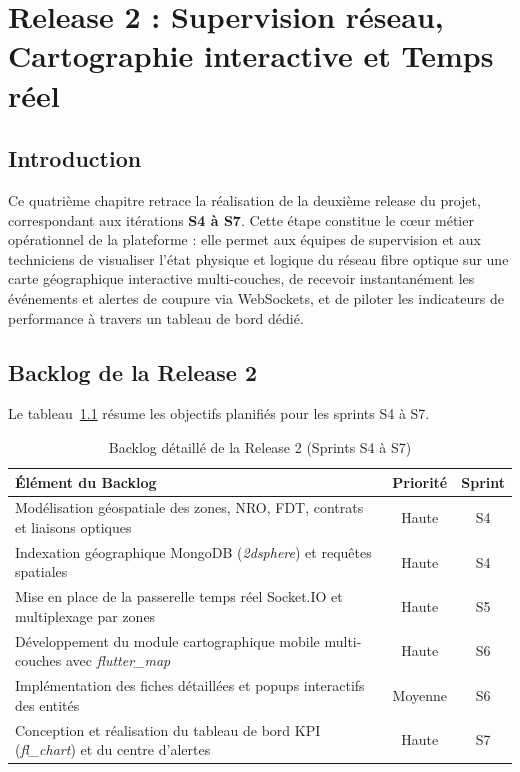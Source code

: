 \chapter{Release 2 : Supervision r\'eseau, Cartographie interactive et Temps r\'eel}
\label{chap:sprint_superv}

\section*{Introduction}
Ce quatri\`eme chapitre retrace la r\'ealisation de la deuxi\`eme release du projet, correspondant aux it\'erations \textbf{S4 \`a S7}. Cette \'etape constitue le c\oe ur m\'etier op\'erationnel de la plateforme : elle permet aux \'equipes de supervision et aux techniciens de visualiser l'\'etat physique et logique du r\'eseau fibre optique sur une carte g\'eographique interactive multi-couches, de recevoir instantan\'ement les \'ev\'enements et alertes de coupure via WebSockets, et de piloter les indicateurs de performance \`a travers un tableau de bord d\'edi\'e.

\section{Backlog de la Release 2}
Le tableau~\ref{tab:backlog-release2} r\'esume les objectifs planifi\'es pour les sprints S4 \`a S7.

\begin{table}[H]
\centering
\begin{tabular}{|p{8.5cm}|c|c|}
\hline
\textbf{\'El\'ement du Backlog} & \textbf{Priorit\'e} & \textbf{Sprint} \\
\hline
Mod\'elisation g\'eospatiale des zones, NRO, FDT, contrats et liaisons optiques & Haute & S4 \\
\hline
Indexation g\'eographique MongoDB (\textit{2dsphere}) et requ\^etes spatiales & Haute & S4 \\
\hline
Mise en place de la passerelle temps r\'eel Socket.IO et multiplexage par zones & Haute & S5 \\
\hline
D\'eveloppement du module cartographique mobile multi-couches avec \textit{flutter\_map} & Haute & S6 \\
\hline
Impl\'ementation des fiches d\'etaill\'ees et popups interactifs des entit\'es & Moyenne & S6 \\
\hline
Conception et r\'ealisation du tableau de bord KPI (\textit{fl\_chart}) et du centre d'alertes & Haute & S7 \\
\hline
\end{tabular}
\caption{Backlog d\'etaill\'e de la Release 2 (Sprints S4 \`a S7)}
\label{tab:backlog-release2}
\end{table}

